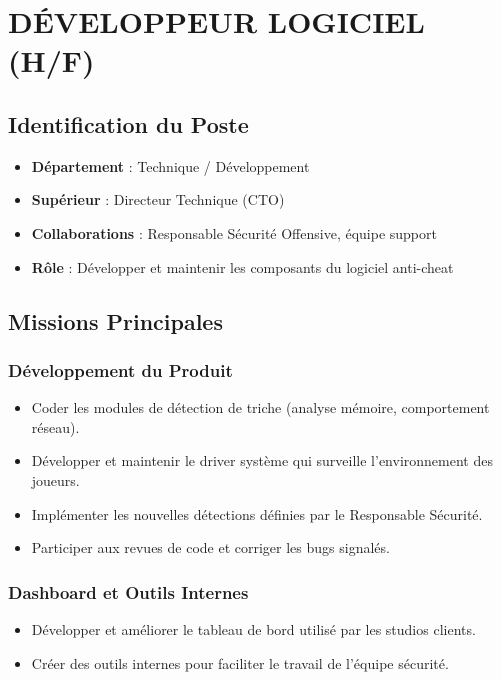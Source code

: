 \documentclass[12pt,a4paper]{article}
\begin{document}
\section{DÉVELOPPEUR LOGICIEL (H/F)}

\subsection{Identification du Poste}
\begin{itemize}[label=\textbullet]
    \item \textbf{Département} : Technique / Développement
    \item \textbf{Supérieur} : Directeur Technique (CTO)
    \item \textbf{Collaborations} : Responsable Sécurité Offensive, équipe support
    \item \textbf{Rôle} : Développer et maintenir les composants du logiciel anti-cheat
\end{itemize}

\subsection{Missions Principales}

\subsubsection{Développement du Produit}
\begin{itemize}[label=\textbullet]
    \item Coder les modules de détection de triche (analyse mémoire, comportement réseau).
    \item Développer et maintenir le driver système qui surveille l'environnement des joueurs.
    \item Implémenter les nouvelles détections définies par le Responsable Sécurité.
    \item Participer aux revues de code et corriger les bugs signalés.
\end{itemize}

\subsubsection{Dashboard et Outils Internes}
\begin{itemize}[label=\textbullet]
    \item Développer et améliorer le tableau de bord utilisé par les studios clients.
    \item Créer des outils internes pour faciliter le travail de l'équipe sécurité.
\end{itemize}
\end{document}
